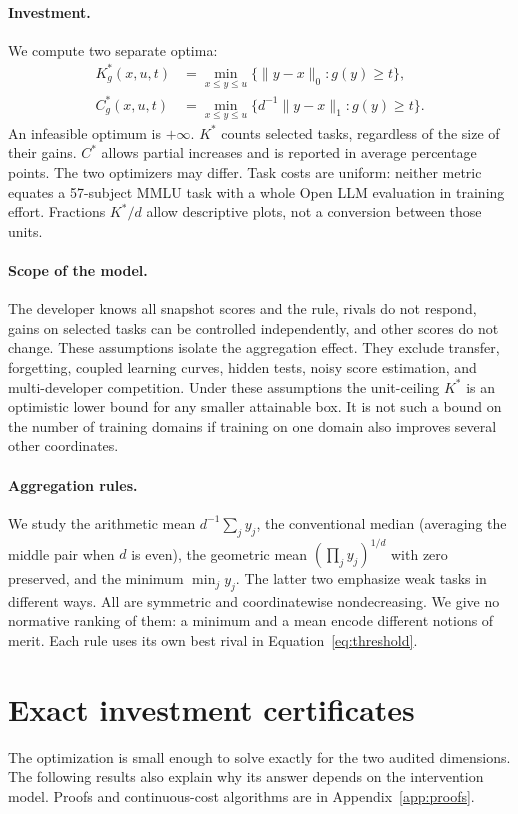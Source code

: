 \documentclass{article}
\newcommand{\K}{K^*}
\newcommand{\C}{C^*}
\begin{document}
\paragraph{Investment.}
We compute two separate optima:
\begin{align}
 \K_g(x,u,t)&=\min_{x\le y\le u}\{\|y-x\|_0:g(y)\ge t\},\label{eq:k}\\
 \C_g(x,u,t)&=\min_{x\le y\le u}\{d^{-1}\|y-x\|_1:g(y)\ge t\}.\label{eq:c}
\end{align}
An infeasible optimum is $+\infty$. $K^*$ counts selected tasks, regardless of the
size of their gains. $C^*$ allows partial increases and is reported in average
percentage points. The two optimizers may differ. Task costs are uniform: neither
metric equates a 57-subject MMLU task with a whole Open LLM evaluation in training
effort. Fractions $K^*/d$ allow descriptive plots, not a conversion between those units.

\paragraph{Scope of the model.}
The developer knows all snapshot scores and the rule, rivals do not respond, gains
on selected tasks can be controlled independently, and other scores do not change.
These assumptions isolate the aggregation effect. They exclude transfer, forgetting,
coupled learning curves, hidden tests, noisy score estimation, and multi-developer
competition. Under these assumptions the unit-ceiling $K^*$ is an optimistic lower
bound for any smaller attainable box. It is not such a bound on the number of
training domains if training on one domain also improves several other coordinates.

\paragraph{Aggregation rules.}
We study the arithmetic mean $d^{-1}\sum_jy_j$, the conventional median (averaging
the middle pair when $d$ is even), the geometric mean $(\prod_jy_j)^{1/d}$ with
zero preserved, and the minimum $\min_jy_j$. The latter two emphasize weak tasks in
different ways. All are symmetric and coordinatewise nondecreasing. We give no
normative ranking of them: a minimum and a mean encode different notions of merit.
Each rule uses its own best rival in Equation~\ref{eq:threshold}.

\section{Exact investment certificates}
\label{sec:methods}
The optimization is small enough to solve exactly for the two audited dimensions.
The following results also explain why its answer depends on the intervention model.
Proofs and continuous-cost algorithms are in Appendix~\ref{app:proofs}.
\end{document}
